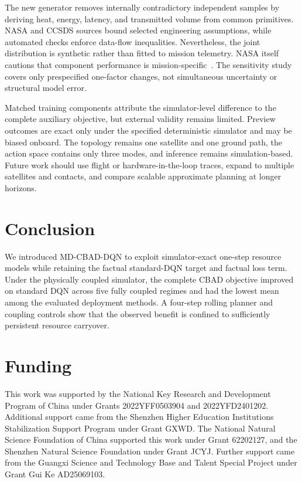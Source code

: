 \documentclass[11pt]{article}
\newcommand{\method}{MD-CBAD-DQN\xspace}
\begin{document}
The new generator removes internally contradictory independent samples by deriving heat, energy, latency, and transmitted volume from common primitives. NASA and CCSDS sources bound selected engineering assumptions, while automated checks enforce data-flow inequalities. Nevertheless, the joint distribution is synthetic rather than fitted to mission telemetry. NASA itself cautions that component performance is mission-specific~\cite{nasa2026soa}. The sensitivity study covers only prespecified one-factor changes, not simultaneous uncertainty or structural model error.

Matched training components attribute the simulator-level difference to the complete auxiliary objective, but external validity remains limited. Preview outcomes are exact only under the specified deterministic simulator and may be biased onboard. The topology remains one satellite and one ground path, the action space contains only three modes, and inference remains simulation-based. Future work should use flight or hardware-in-the-loop traces, expand to multiple satellites and contacts, and compare scalable approximate planning at longer horizons.

\section{Conclusion}

We introduced \method to exploit simulator-exact one-step resource models while retaining the factual standard-DQN target and factual loss term. Under the physically coupled simulator, the complete CBAD objective improved on standard DQN across five fully coupled regimes and had the lowest mean among the evaluated deployment methods. A four-step rolling planner and coupling controls show that the observed benefit is confined to sufficiently persistent resource carryover.

\section*{Funding}

This work was supported by the National Key Research and Development Program of China under Grants 2022YFF0503904 and 2022YFD2401202. Additional support came from the Shenzhen Higher Education Institutions Stabilization Support Program under Grant GXWD. The National Natural Science Foundation of China supported this work under Grant 62202127, and the Shenzhen Natural Science Foundation under Grant JCYJ. Further support came from the Guangxi Science and Technology Base and Talent Special Project under Grant Gui Ke AD25069103.
\end{document}
